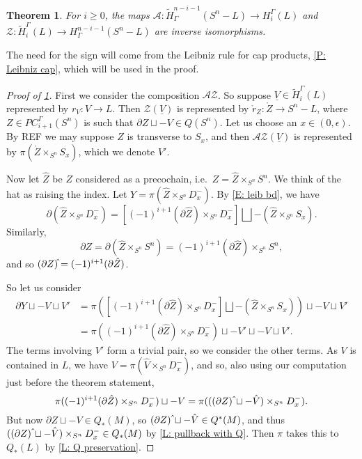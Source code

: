 \documentclass[12pt]{article}
\theoremstyle{plain}
\newtheorem{theorem}{Theorem}[section]
\theoremstyle{definition}
\theoremstyle{remark}
\newcommand{\uV}{\underline{V}}
\newcommand{\td}[1]{\tilde{#1}}
\newcommand{\mr}[1]{\mathring{#1}}
\newcommand{\bd}{\partial}
\newcommand{\mc}[1]{\mathcal{#1}}
\begin{document}
\begin{theorem}\label{T: alex duality}
For $i \geq 0$, the maps  $\mc A \colon \td H^{n-i-1}_\Gamma(S^n-L) \to H_i^\Gamma(L)$ and $\mc Z \colon \td H_i^\Gamma(L) \to H^{n-i-1}_\Gamma(S^n-L)$ are inverse isomorphisms.
\end{theorem}
The need for the sign will come from the Leibniz rule for cap products, \cref{P: Leibniz cap}, which will be used in the proof.


\begin{proof}[Proof of \cref{T: alex duality}]
First we consider the composition $\mc A \mc Z$.
So suppose $\uV \in \td H_i^\Gamma(L)$ represented by $r_V \colon V \to L$.
Then $\mc Z(\uV)$ is represented by $\mr r_Z \colon \mr Z \to S^n-L$, where $Z \in PC_{i+1}^\Gamma(S^n)$ is such that $\bd Z \sqcup -V \in Q(S^n)$.
Let us choose an $x \in (0,\epsilon)$.
By REF we may suppose $Z$ is transverse to $S_x$, and then $\mc A \mc Z(\uV)$ is represented by $\pi(\mr Z \times_{S^n} S_x)$, which we denote $V'$.

Now let $\hat Z$ be $Z$ considered as a precochain, i.e.\ $Z = \hat Z \times_{S^n} S^n$.
We think of the hat as raising the index.
Let $Y = \pi(\hat Z \times_{S^n} D_x^-)$.
By \eqref{E: leib bd}, we have
$$\bd (\hat Z \times_{S^n} D_x^-) = \left[(-1)^{i+1} (\bd \hat Z) \times_{S^n} D_x^-\right] \bigsqcup - (\hat Z \times_{S^n} S_x).$$
Similarly, $$\bd Z = \bd(\hat Z \times_{S^n} S^n) = (-1)^{i+1} (\bd \hat Z) \times_{S^n} S^n,$$
and so $(\bd Z)\hat{\vrule height1.3ex width0pt} = (-1)^{i+1} (\bd \hat Z)$.


So let us consider
\begin{align*}
\bd Y \sqcup -V\sqcup V'&=
\pi(\left[(-1)^{i+1} (\bd \hat Z) \times_{S^n} D_x^-\right] \bigsqcup - (\hat Z \times_{S^n} S_x))\sqcup -V \sqcup V'\\
&=\pi((-1)^{i+1} (\bd \hat Z) \times_{S^n} D_x^-) \sqcup -V' \sqcup -V \sqcup V'.
\end{align*}
The terms involving $V'$ form a trivial pair, so we consider the other terms.
As $V$ is contained in $L$, we have $V = \pi(\hat V \times_{S^n} D_x^-)$, and so, also using our computation just before the theorem statement,
$$\pi((-1)^{i+1} (\bd \hat Z) \times_{S^n} D_x^-) \sqcup -V = \pi(((\bd  Z)\,\hat{\vrule height1.3ex width0pt} \sqcup -\hat V) \times_{S^n} D_x^-).$$
But now $\bd Z \sqcup -V \in Q_*(M)$, so $(\bd  Z)\,\hat{\vrule height1.3ex width0pt} \sqcup -\hat V \in Q^*(M)$, and thus $((\bd  Z)\,\hat{\vrule height1.3ex width0pt} \sqcup -\hat V) \times_{S^n} D_x^- \in Q_*(M)$ by \cref{L: pullback with Q}.
Then $\pi$ takes this to $Q_*(L)$ by \cref{L: Q preservation}.


\end{proof}
\end{document}
